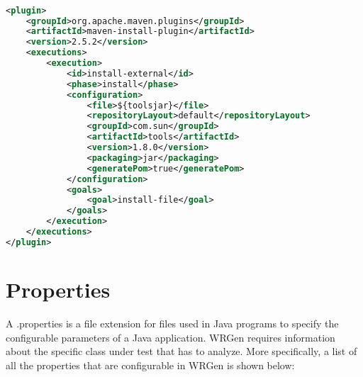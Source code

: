 \begin{lstlisting}[language=XML,caption={How to 'mvn install' the tools.jar},label={lst:instToolsJar}]% Start your code-block

<plugin>
	<groupId>org.apache.maven.plugins</groupId>
	<artifactId>maven-install-plugin</artifactId>
	<version>2.5.2</version>
	<executions>
		<execution>
			<id>install-external</id>
			<phase>install</phase>
			<configuration>
				<file>${toolsjar}</file>
				<repositoryLayout>default</repositoryLayout>
				<groupId>com.sun</groupId>
				<artifactId>tools</artifactId>
				<version>1.8.0</version>
				<packaging>jar</packaging>
				<generatePom>true</generatePom>
			</configuration>
			<goals>
				<goal>install-file</goal>
			</goals>
		</execution>
	</executions>
</plugin>
\end{lstlisting}

\section{Properties}\label{sec:prop}
A .properties is a file extension for files used in Java programs to specify the configurable parameters of a Java application. WRGen requires information about the specific class under test that has to analyze. More specifically, a list of all the properties that are configurable in WRGen is shown below:

